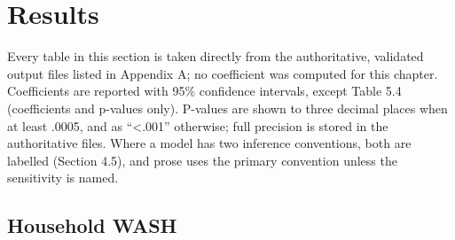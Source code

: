 
\section{Results}\label{sec:5}

Every table in this section is taken directly from the authoritative, validated output files listed in Appendix A; no coefficient was computed for this chapter. Coefficients are reported with 95\% confidence intervals, except Table 5.4 (coefficients and p-values only). P-values are shown to three decimal places when at least .0005, and as ``\textless.001'' otherwise; full precision is stored in the authoritative files. Where a model has two inference conventions, both are labelled (Section 4.5), and prose uses the primary convention unless the sensitivity is named.

\subsection{Household WASH}\label{sec:5.1}



